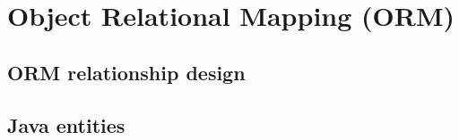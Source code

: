 
\chapter{Object Relational Mapping (ORM)}

\section{ORM relationship design}
\blindtext

\section{Java entities}
\blindtext